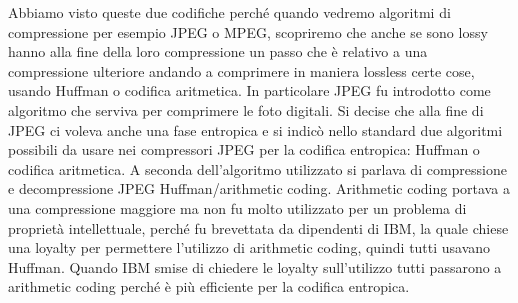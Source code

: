 Abbiamo visto queste due codifiche perché quando vedremo algoritmi di compressione per esempio JPEG o MPEG, scopriremo che anche se sono lossy hanno alla fine della loro compressione un passo che è relativo a una compressione ulteriore andando a comprimere in maniera lossless certe cose, usando Huffman o codifica aritmetica. In particolare JPEG fu introdotto come algoritmo che serviva per comprimere le foto digitali. Si decise che alla fine di JPEG ci voleva anche una fase entropica e si indicò nello standard due algoritmi possibili da usare nei compressori JPEG per la codifica entropica: Huffman o codifica aritmetica. A seconda dell'algoritmo utilizzato si parlava di compressione e decompressione JPEG Huffman/arithmetic coding. Arithmetic coding portava a una compressione maggiore ma non fu molto utilizzato per un problema di proprietà intellettuale, perché fu brevettata da dipendenti di IBM, la quale chiese una loyalty per permettere l'utilizzo di arithmetic coding, quindi tutti usavano Huffman. Quando IBM smise di chiedere le loyalty sull'utilizzo tutti passarono a arithmetic coding perché è più efficiente per la codifica entropica.

\let\cleardoublepage\clearpage